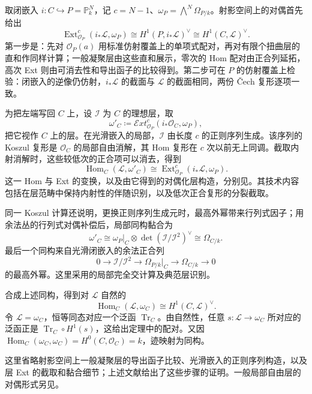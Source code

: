 \begin{proofsketch}
	取闭嵌入 \(i:C\hookrightarrow P=\mathbb P_k^N\)，记 \(c=N-1\)、\(\omega_P=\bigwedge^N\Omega_{P/k}\)。射影空间上的对偶首先给出
	\[
		\operatorname{Ext}^{c}_{\mathcal O_P}(i_*\mathcal L,\omega_P)
		\cong H^1(P,i_*\mathcal L)^\vee
		\cong H^1(C,\mathcal L)^\vee.
	\]
	第一步是\cite[Chapter III, Theorem 7.1, p. 240]{Hartshorne1977}：先对 \(\mathcal O_P(a)\) 用标准仿射覆盖上的单项式配对，再对有限个扭曲层的直和作同样计算；一般凝聚层由这些直和展示，零次的 Hom 配对由正合列延拓，高次 Ext 则由可消去性和导出函子的比较得到。第二步可在 \(P\) 的仿射覆盖上检验：闭嵌入的逆像仍仿射，\(i_*\mathcal L\) 的截面与 \(\mathcal L\) 的截面相同，两份 Čech 复形逐项一致。

	为把左端写回 \(C\) 上，设 \(\mathcal I\) 为 \(C\) 的理想层，取
	\[
		\omega'_C\coloneqq
		\mathcal{E}xt^c_{\mathcal O_P}(i_*\mathcal O_C,\omega_P),
	\]
	把它视作 \(C\) 上的层。在光滑嵌入的局部，\(\mathcal I\) 由长度 \(c\) 的正则序列生成。该序列的 Koszul 复形是 \(\mathcal O_C\) 的局部自由消解，其 Hom 复形在 \(c\) 次以前无上同调。截取内射消解时，这些较低次的正合项可以消去，得到
	\[
		\operatorname{Hom}_C(\mathcal L,\omega'_C)
		\cong\operatorname{Ext}^c_{\mathcal O_P}(i_*\mathcal L,\omega_P).
	\]
	这一 Hom 与 Ext 的变换，以及由它得到的对偶化层构造，分别见\cite[Chapter III, Lemma 7.4 and Proposition 7.5, p. 242]{Hartshorne1977}。其技术内容包括在层范畴中保持内射性的伴随识别，以及低次正合复形的分裂截取。

	同一 Koszul 计算还说明，更换正则序列生成元时，最高外幂带来行列式因子；用余法丛的行列式对偶补偿后，局部同构黏合为
	\[
		\omega'_C\cong\omega_P|_C\otimes\det(\mathcal I/\mathcal I^2)^\vee
		\cong\Omega_{C/k}.
	\]
	最后一个同构来自光滑闭嵌入的余法正合列
	\[
		0\longrightarrow\mathcal I/\mathcal I^2
		\longrightarrow\Omega_{P/k}|_C
		\longrightarrow\Omega_{C/k}\longrightarrow0
	\]
	的最高外幂。这里采用\cite[Chapter III, Theorem 7.11 and Corollary 7.12, pp. 245--246]{Hartshorne1977}的局部完全交计算及典范层识别。

	合成上述同构，得到对 \(\mathcal L\) 自然的
	\[
		\operatorname{Hom}_C(\mathcal L,\omega_C)
		\cong H^1(C,\mathcal L)^\vee.
	\]
	令 \(\mathcal L=\omega_C\)，恒等同态对应一个泛函 \(\operatorname{Tr}_C\)。由自然性，任意 \(s:\mathcal L\rightarrow\omega_C\) 所对应的泛函正是 \(\operatorname{Tr}_C\circ H^1(s)\)，这给出定理中的配对。又因 \(\operatorname{Hom}_C(\omega_C,\omega_C)=H^0(C,\mathcal O_C)=k\)，迹映射为同构。

	这里省略射影空间上一般凝聚层的导出函子比较、光滑嵌入的正则序列构造，以及层 Ext 的截取和黏合细节；上述文献给出了这些步骤的证明。一般局部自由层的对偶形式另见\cite[Chapter III, Corollary 7.7, p. 244; Corollary 7.12 and Remark 7.12.2, p. 246]{Hartshorne1977}。
\end{proofsketch}

